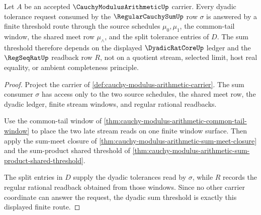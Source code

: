 \begin{theorem}
\label{thm:cauchy-modulus-arithmetic-dyadic-sum-threshold}
Let $A$ be an accepted $\CauchyModulusArithmeticUp$ carrier. Every dyadic
tolerance request consumed by the $\RegularCauchySumUp$ row $\sigma$ is
answered by a finite threshold route through the source schedules
$\mu_0,\mu_1$, the common-tail window, the shared meet row $\mu_{\wedge}$, and
the split tolerance entries of $D$. The sum threshold therefore depends on the
displayed $\DyadicRatCoreUp$ ledger and the $\RegSeqRatUp$ readback row $R$,
not on a quotient stream, selected limit, host real equality, or ambient
completeness principle.
\end{theorem}
\begin{proof}
Project the carrier of
\autoref{def:cauchy-modulus-arithmetic-carrier}. The sum consumer $\sigma$ has
access only to the two source schedules, the shared meet row, the dyadic
ledger, finite stream windows, and regular rational readbacks.

Use the common-tail window of
\autoref{thm:cauchy-modulus-arithmetic-common-tail-window} to place the two
late stream reads on one finite window surface. Then apply the sum-meet closure
of \autoref{thm:cauchy-modulus-arithmetic-sum-meet-closure} and the
sum-product shared threshold of
\autoref{thm:cauchy-modulus-arithmetic-sum-product-shared-threshold}.

The split entries in $D$ supply the dyadic tolerances read by $\sigma$, while
$R$ records the regular rational readback obtained from those windows. Since no
other carrier coordinate can answer the request, the dyadic sum threshold is
exactly this displayed finite route.
\end{proof}

